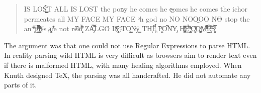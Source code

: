 \begin{quotation}
IS LOŚ͖̩͇̗̪̏̈́T ALL I​S LOST the pon̷y he comes he c̶̮omes he comes the ich​or permeates all MY FACE MY FACE ᵒh god no NO NOO̼O​O NΘ stop the an​*̶͑̾̾​̅ͫ͏̙̤g͇̫͛͆̾ͫ̑͆l͖͉̗̩̳̟̍ͫͥͨe̠̅s ͎a̧͈͖r̽̾̈́͒͑e n​ot rè̑ͧ̌aͨl̘̝̙̃ͤ͂̾̆ ZA̡͊͠͝LGΌ ISͮ̂҉̯͈͕̹̘̱ TO͇̹̺ͅƝ̴ȳ̳ TH̘Ë͖́̉ ͠P̯͍̭O̚​N̐Y̡ H̸̡̪̯ͨ͊̽̅̾̎Ȩ̬̩̾͛ͪ̈́̀́͘ ̶̧̨̱̹̭̯ͧ̾ͬC̷̙̲̝͖ͭ̏ͥͮ͟Oͮ͏̮̪̝͍M̲̖͊̒ͪͩͬ̚̚͜Ȇ̴̟̟͙̞ͩ͌͝S̨̥̫͎̭ͯ̿̔̀ͅ
\end{quotation}

The argument was that one could not use Regular Expressions to parse HTML. In reality parsing wild HTML is very difficult as browsers aim to render text even if there is malformed HTML, with many healing algorithms employed. When Knuth designed TeX, the parsing was all handcrafted. He did not automate any parts of it.

